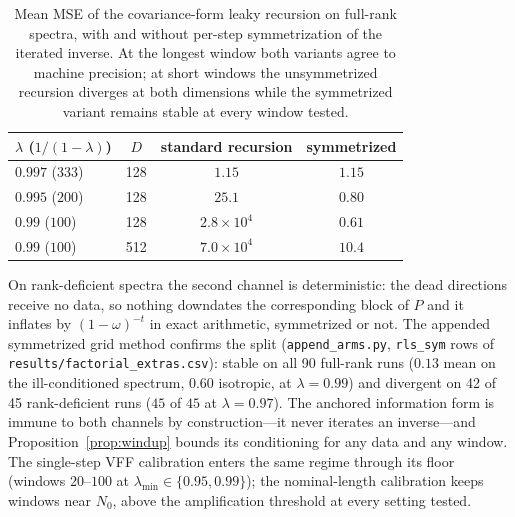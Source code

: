 \begin{table}[h]
\centering
\small
\caption{Mean MSE of the covariance-form leaky recursion on full-rank spectra, with and without per-step symmetrization of the iterated inverse.
At the longest window both variants agree to machine precision; at short windows the unsymmetrized recursion diverges at both dimensions while the symmetrized variant remains stable at every window tested.}
\label{tab:windup-mech}
\begin{tabular}{lccc}
\toprule
$\lambda$ ($1/(1-\lambda)$) & $D$ & standard recursion & symmetrized \\
\midrule
$0.997$ ($333$) & 128 & $1.15$ & $1.15$ \\
$0.995$ ($200$) & 128 & $25.1$ & $0.80$ \\
$0.99$ ($100$) & 128 & $2.8 \times 10^{4}$ & $0.61$ \\
$0.99$ ($100$) & 512 & $7.0 \times 10^{4}$ & $10.4$ \\
\bottomrule
\end{tabular}
\end{table}

On rank-deficient spectra the second channel is deterministic: the dead directions receive no data, so nothing downdates the corresponding block of $P$ and it inflates by $(1{-}\omega)^{-t}$ in exact arithmetic, symmetrized or not.
The appended symmetrized grid method confirms the split (\texttt{append\_arms.py}, \texttt{rls\_sym} rows of \texttt{results/factorial\_extras.csv}): stable on all 90 full-rank runs ($0.13$ mean on the ill-conditioned spectrum, $0.60$ isotropic, at $\lambda = 0.99$) and divergent on 42 of 45 rank-deficient runs ($45$ of $45$ at $\lambda = 0.97$).
The anchored information form is immune to both channels by construction---it never iterates an inverse---and Proposition~\ref{prop:windup} bounds its conditioning for any data and any window.
The single-step VFF calibration enters the same regime through its floor (windows $20$--$100$ at $\lambda_{\min} \in \{0.95, 0.99\}$); the nominal-length calibration keeps windows near $N_0$, above the amplification threshold at every setting tested.

